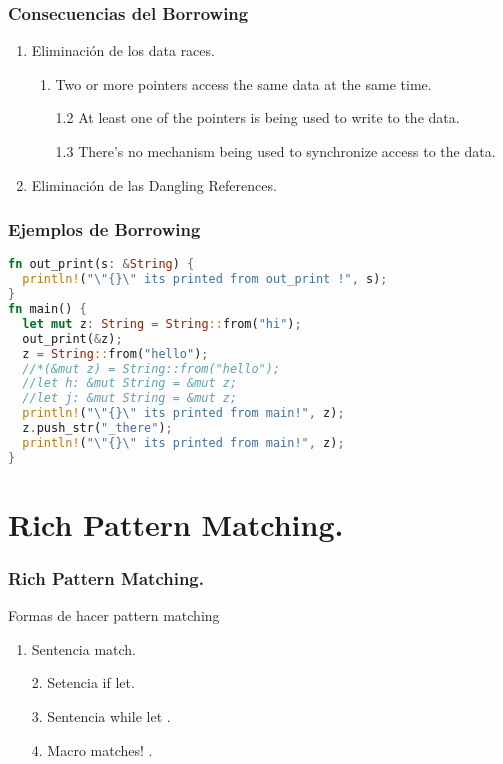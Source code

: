 \documentclass{beamer}
\begin{document}
\begin{frame}
  \frametitle{Consecuencias del Borrowing}
  
\begin{enumerate}[1]
  \item Eliminación de los data races.
  \pause
  \begin{enumerate}[1.1]
  \item Two or more pointers access the same data at the same time.
  \pause
  \item [1.2] At least one of the pointers is being used to write to the data.
  \pause
  \item [1.3] There’s no mechanism being used to synchronize access to the data.
  \end{enumerate}
  
  \bigbreak
  \pause
  \item Eliminación de las Dangling References.
\end{enumerate}
\end{frame}
\begin{frame}[fragile]
  \frametitle{Ejemplos de Borrowing}
  \begin{lstlisting}[language=Rust, style=boxed ]
fn out_print(s: &String) {
  println!("\"{}\" its printed from out_print !", s);
}
fn main() {
  let mut z: String = String::from("hi");
  out_print(&z);
  z = String::from("hello");
  //*(&mut z) = String::from("hello");
  //let h: &mut String = &mut z;
  //let j: &mut String = &mut z;
  println!("\"{}\" its printed from main!", z);
  z.push_str("_there");
  println!("\"{}\" its printed from main!", z);
}\end{lstlisting}
\end{frame}


\section{Rich Pattern Matching.}

\begin{frame}
  \frametitle{Rich Pattern Matching. }
  Formas de hacer pattern matching
  \begin{enumerate}[1.]
    \item Sentencia match.
    \pause
    \item    [2.] Setencia if let.
    \pause
    \item    [3.] Sentencia while let .
    \pause
    \item    [4.] Macro matches! .
  \end{enumerate}
\end{frame}
\end{document}
